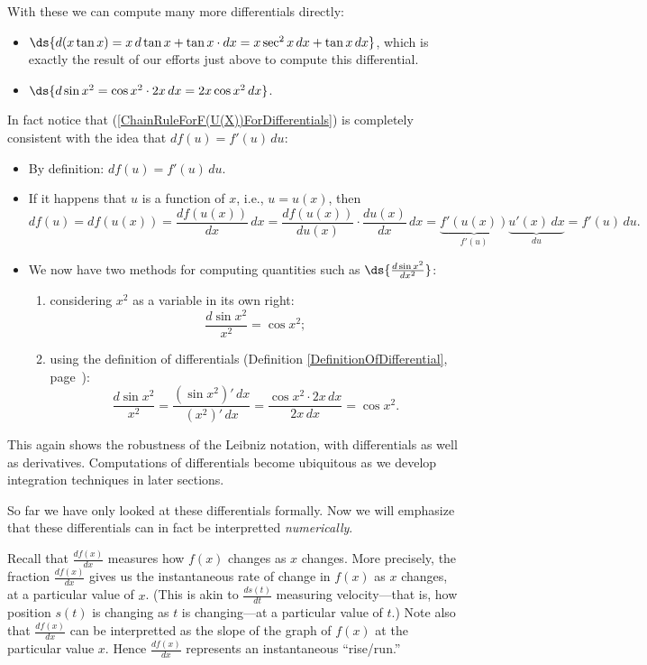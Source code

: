 With these we can compute many more differentials directly:
\begin{itemize}
\item $\ds{d( x\tan x)=x\,d\tan x+\tan x\cdot dx=x\sec^2x\,dx+\tan x\,dx}$,
      which is exactly the result of our efforts just above to compute
      this differential.
\item $\ds{d\sin x^2=\cos x^2\cdot 2x\,dx=2x\cos x^2\,dx}$.
\end{itemize}
In fact notice that (\ref{ChainRuleForF(U(X))ForDifferentials})
is completely consistent with the idea that $df(u)=f'(u)\,du$:
\begin{itemize}
\item By definition: $df(u)=f'(u)\,du$.
\item If it happens that $u$ is a function of $x$, i.e., $u=u(x)$, then 
$$df(u)=df(u(x))=\frac{df(u(x))}{dx}\,dx
                =\frac{df(u(x))}{du(x)}\cdot\frac{du(x)}{dx}\,dx
                =\underbrace{f'(u(x))}_{f'(u)}\underbrace{u'(x)\,dx}_{du}
                =f'(u)\,du.$$
\item We now have two methods for computing quantities such as
      $\ds{\frac{d\sin x^2}{dx^2}}$:
  \begin{enumerate}
  \item considering $x^2$ as a variable in its own right:
          $$\frac{d\sin x^2}{x^2}=\cos x^2;$$
  \item using the definition of differentials
           (Definition \ref{DefinitionOfDifferential},
            page~\pageref{DefinitionOfDifferential}):
          $$\frac{d\sin x^2}{x^2}
              =\frac{(\sin x^2)'\,dx}{(x^2)'\,dx}
              =\frac{\cos x^2\cdot 2x\,dx}{2x\,dx}
              =\cos x^2.$$
  \end{enumerate}
\end{itemize}
This again shows the robustness of the Leibniz notation, with differentials
as well as derivatives. Computations of differentials become
ubiquitous as we develop integration techniques in later sections.

So far we have only looked at these differentials formally.
Now we will emphasize that these differentials can in fact
be interpretted {\it numerically}.  

Recall that $\frac{df(x)}{dx}$ measures how $f(x)$ changes
as $x$ changes.  More precisely, the fraction $\frac{df(x)}{dx}$
gives us the instantaneous rate of change in $f(x)$ as $x$
changes, at a particular value of $x$.  (This is akin to
$\frac{ds(t)}{dt}$ measuring velocity---that is, how position
$s(t)$ is changing as $t$ is changing---at a particular value 
of $t$.)  Note also that $\frac{df(x)}{dx}$ can be interpretted
as the slope of the graph of $f(x)$ at the particular value $x$.
Hence  $\frac{df(x)}{dx}$ represents an instantaneous
``rise/run.''

